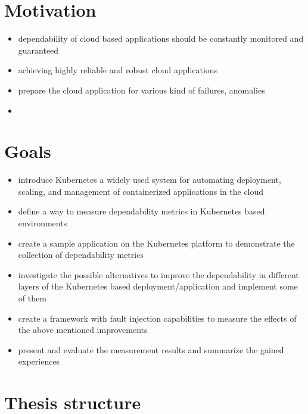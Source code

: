 \section{Motivation}

\begin{itemize}
	\item dependability of cloud based applications should be constantly monitored and guaranteed
	\item achieving highly reliable and robust cloud applications
	\item prepare the cloud application for various kind of failures, anomalies
	\item \etc
\end{itemize}

\section{Goals}

\begin{itemize}
	\item introduce Kubernetes a widely used system for automating deployment, scaling, and management of containerized applications in the cloud
	\item define a way to measure dependability metrics in Kubernetes based environments
	\item create a sample application on the Kubernetes platform to demonstrate the collection of dependability metrics
	\item investigate the possible alternatives to improve the dependability in different layers of the Kubernetes based deployment/application and implement some of them
	\item create a framework with fault injection capabilities to measure the effects of the above mentioned improvements
	\item present and evaluate the measurement results and summarize the gained experiences
\end{itemize}

\section{Thesis structure}

